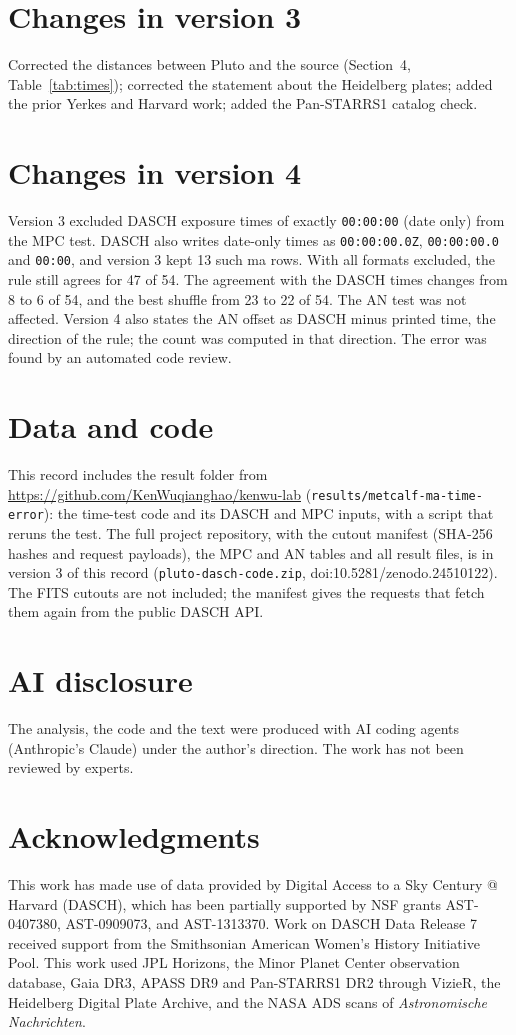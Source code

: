 \documentclass[11pt]{article}
\begin{document}
\section*{Changes in version 3}
Corrected the distances between Pluto and the source (Section~4, Table~\ref{tab:times}); corrected the statement about the Heidelberg plates; added the prior Yerkes and Harvard work; added the Pan-STARRS1 catalog check.

\section*{Changes in version 4}
Version 3 excluded DASCH exposure times of exactly \texttt{00:00:00} (date only) from the MPC test. DASCH also writes date-only times as \texttt{00:00:00.0Z}, \texttt{00:00:00.0} and \texttt{00:00}, and version 3 kept 13 such ma rows. With all formats excluded, the rule still agrees for 47 of 54. The agreement with the DASCH times changes from 8 to 6 of 54, and the best shuffle from 23 to 22 of 54. The AN test was not affected. Version 4 also states the AN offset as DASCH minus printed time, the direction of the rule; the count was computed in that direction. The error was found by an automated code review.

\section*{Data and code}
This record includes the result folder from \url{https://github.com/KenWuqianghao/kenwu-lab} (\texttt{results/metcalf-ma-time-error}): the time-test code and its DASCH and MPC inputs, with a script that reruns the test. The full project repository, with the cutout manifest (SHA-256 hashes and request payloads), the MPC and AN tables and all result files, is in version 3 of this record (\texttt{pluto-dasch-code.zip}, doi:10.5281/zenodo.24510122). The FITS cutouts are not included; the manifest gives the requests that fetch them again from the public DASCH API.

\section*{AI disclosure}
The analysis, the code and the text were produced with AI coding agents (Anthropic's Claude) under the author's direction. The work has not been reviewed by experts.

\section*{Acknowledgments}
This work has made use of data provided by Digital Access to a Sky Century @ Harvard (DASCH), which has been partially supported by NSF grants AST-0407380, AST-0909073, and AST-1313370. Work on DASCH Data Release 7 received support from the Smithsonian American Women's History Initiative Pool. This work used JPL Horizons, the Minor Planet Center observation database, Gaia DR3, APASS DR9 and Pan-STARRS1 DR2 through VizieR, the Heidelberg Digital Plate Archive, and the NASA ADS scans of \emph{Astronomische Nachrichten}.
\end{document}
